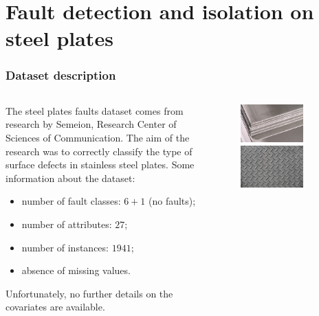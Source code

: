 \section{Fault detection and isolation on steel plates}

\begin{frame}
	\frametitle{Dataset description}
	\begin{columns}
		\begin{column}{0.50\textwidth}
			\justifying
			The steel plates faults dataset comes from research by Semeion, Research Center of Sciences of Communication. The aim of the research was to correctly classify the type of surface defects in stainless steel plates. Some information about the dataset:
			\begin{itemize}
				\item number of fault classes: $6 + 1$ (no faults);
				\item number of attributes: $27$;
				\item number of instances: $1941$;
				\item absence of missing values.
			\end{itemize}
			Unfortunately, no further details on the covariates are available.
		\end{column}
		\begin{column}{0.50\textwidth}
			\begin{figure}
				\centering
				\includegraphics[width=0.75\textwidth]{Images/steel_plates_1.jpg}\\
				\vspace{0.5cm}
			    \includegraphics[width=0.75\textwidth]{Images/steel_plates_2.jpg}
			\end{figure}
		\end{column}
	\end{columns}
\end{frame}

